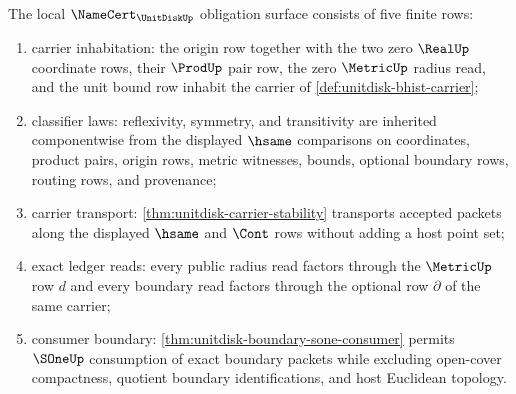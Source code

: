 \begin{theorem}
\label{thm:unitdisk-namecert-obligation-surface}
The local $\NameCert_{\UnitDiskUp}$ obligation surface consists of five finite rows:
\begin{enumerate}
\item carrier inhabitation: the origin row together with the two zero $\RealUp$ coordinate rows, their $\ProdUp$ pair row, the zero $\MetricUp$ radius read, and the unit bound row inhabit the carrier of \autoref{def:unitdisk-bhist-carrier};
\item classifier laws: reflexivity, symmetry, and transitivity are inherited componentwise from the displayed $\hsame$ comparisons on coordinates, product pairs, origin rows, metric witnesses, bounds, optional boundary rows, routing rows, and provenance;
\item carrier transport: \autoref{thm:unitdisk-carrier-stability} transports accepted packets along the displayed $\hsame$ and $\Cont$ rows without adding a host point set;
\item exact ledger reads: every public radius read factors through the $\MetricUp$ row $d$ and every boundary read factors through the optional row $\partial$ of the same carrier;
\item consumer boundary: \autoref{thm:unitdisk-boundary-sone-consumer} permits $\SOneUp$ consumption of exact boundary packets while excluding open-cover compactness, quotient boundary identifications, and host Euclidean topology.
\end{enumerate}
\end{theorem}
